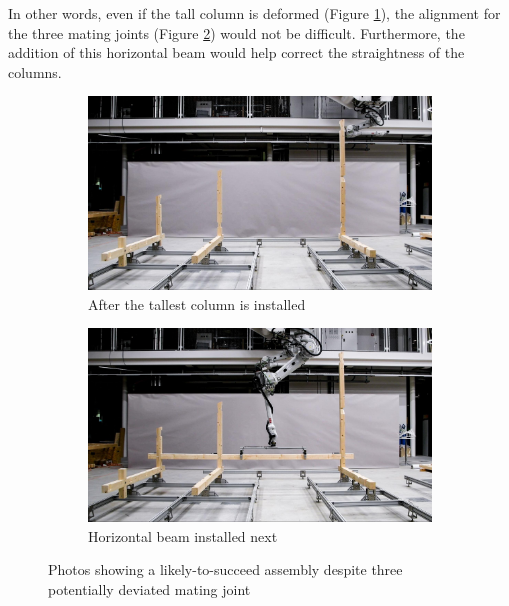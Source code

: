 In other words, even if the tall column is deformed (Figure \ref{fig:after-the-tallest-column-is-installed}), the alignment for the three mating joints (Figure \ref{fig:horizontal-beam-installed-next}) would not be difficult. Furthermore, the addition of this horizontal beam would help correct the straightness of the columns.

\begin{figure}[!h]
    \centering
    \begin{subfigure}[b]{0.49\textwidth}
        \centering
        \includegraphics[width=\textwidth]{images/7b/img45.jpg}
        \caption{After the tallest column is installed}
        \label{fig:after-the-tallest-column-is-installed}
    \end{subfigure}
    \hfill
    \begin{subfigure}[b]{0.49\textwidth}
        \centering
        \includegraphics[width=\textwidth]{images/7b/img46.jpg}
        \caption{Horizontal beam installed next}
        \label{fig:horizontal-beam-installed-next}
    \end{subfigure}
    \caption{Photos showing a likely-to-succeed assembly despite three potentially deviated mating joint} 
    \label{fig:global-correction-approach-low-risk}
\end{figure}

